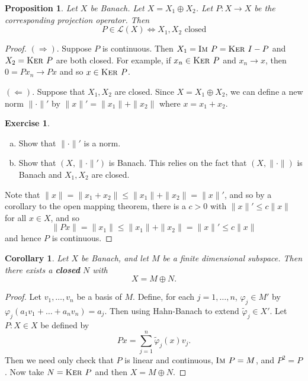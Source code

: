 \documentclass[justified]{tufte-book}
\theoremstyle{plain}%
\newtheorem{prop}[thm]{Proposition}
\newtheorem*{cor}{Corollary}
\theoremstyle{definition}
\newtheorem{exer}[thm]{Exercise}
\theoremstyle{remark}
\renewcommand{\phi}{\varphi}
\newcommand{\im}{\textsc{Im\ }}
\renewcommand{\ker}{\textsc{Ker\ }}
\begin{document}
\begin{prop}
  Let $X$ be Banach.  Let $X = X_1 \oplus X_2$.  Let $P : X \rightarrow X$ be the corresponding projection operator.  Then \[
      P \in \mathcal L (X) \iff \text{$X_1, X_2$ closed}
  \]
\end{prop}
\begin{proof}
  $(\Rightarrow)$.  Suppose $P$ is continuous.  Then $X_1 = \im P = \ker I - P$ and $X_2 = \ker P$ are both closed.  For example, if $x_n \in \ker P$ and $x_n \rightarrow x$, then $0 = P x_n \rightarrow Px$ and so $x \in \ker P$.  
  
  $(\Leftarrow)$.  Suppose that $X_1, X_2$ are closed.  Since $X = X_1 \oplus X_2$, we can define a new norm $\| \cdot \|'$ by $\| x \|' = \| x_1 \| + \| x_2 \|$ where $x = x_1 + x_2$.  
  \begin{exer}{\ }
      \begin{enumerate}[(a)]
          \item Show that $\| \cdot \|'$ is a norm.
          \item Show that $(X, \| \cdot \|')$ is Banach.  This relies on the fact that $(X, \| \cdot \|)$ is Banach and $X_1, X_2$ are closed. 
      \end{enumerate}
  \end{exer}
  
  Note that $\| x \| = \| x_1 + x_2 \| \leq \| x_1 \| + \| x_2 \| = \| x \|'$, and so by a corollary to the open mapping theorem, there is a $c > 0$ with $\| x \|' \leq c \| x \|$ for all $x \in X$, and so \[
      \| Px \| = \| x_1 \| \leq \| x_1 \| + \| x_2 \| = \| x \|' \leq c \| x \|
  \] and hence $P$ is continuous.  
\end{proof}




\begin{cor}
  Let $X$ be Banach, and let $M$ be a finite dimensional subspace.  Then there exists a \textbf{closed} $N$ with \[
      X = M \oplus N.
  \]
\end{cor}
\begin{proof}
  Let $v_1, \dots, v_n$ be a basis of $M$.  Define, for each $ j = 1, \dots, n$, $\phi_j \in M'$ by $\phi_j(a_1 v_1 + \dots + a_n v_n) = a_j$.  Then using Hahn-Banach to extend $\tilde \phi_j \in X'$.  Let $P : X \in X$ be defined by \[
      Px = \sum_{j =1 }^n \tilde \phi_j(x) v_j.
  \]  Then we need only check that $P$ is linear and continuous, $\im P = M$, and $P^2 = P$. Now take $N = \ker P$ and then $X = M \oplus N$.
\end{proof}
\end{document}
